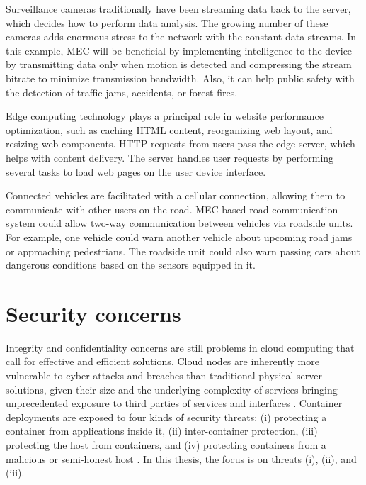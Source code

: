 Surveillance cameras traditionally have been streaming data back to the server, which decides how to perform data analysis. The growing number of these cameras adds enormous stress to the network with the constant data streams. In this example, MEC will be beneficial by implementing intelligence to the device by transmitting data only when motion is detected and compressing the stream bitrate to minimize transmission bandwidth. Also, it can help public safety with the detection of traffic jams, accidents, or forest fires.

Edge computing technology plays a principal role in website performance optimization, such as caching HTML content, reorganizing web layout, and resizing web components. HTTP requests from users pass the edge server, which helps with content delivery. The server handles user requests by performing several tasks to load web pages on the user device interface. \cite{Abbas2018}

Connected vehicles are facilitated with a cellular connection, allowing them to communicate with other users on the road. MEC-based road communication system could allow two-way communication between vehicles via roadside units. For example, one vehicle could warn another vehicle about upcoming road jams or approaching pedestrians. The roadside unit could also warn passing cars about dangerous conditions based on the sensors equipped in it. \cite{Abbas2018}

\section{Security concerns}
\label{section:security}

Integrity and confidentiality concerns are still problems in cloud computing that call for effective and efficient solutions. Cloud nodes are inherently more vulnerable to cyber-attacks and breaches than traditional physical server solutions, given their size and the underlying complexity of services bringing unprecedented exposure to third parties of services and interfaces \cite{Lombardi2011}. Container deployments are exposed to four kinds of security threats: (i) protecting a container from applications inside it, (ii) inter-container protection, (iii) protecting the host from containers, and (iv) protecting containers from a malicious or semi-honest host \cite{Flauzac2020}. In this thesis, the focus is on threats (i), (ii), and (iii).


